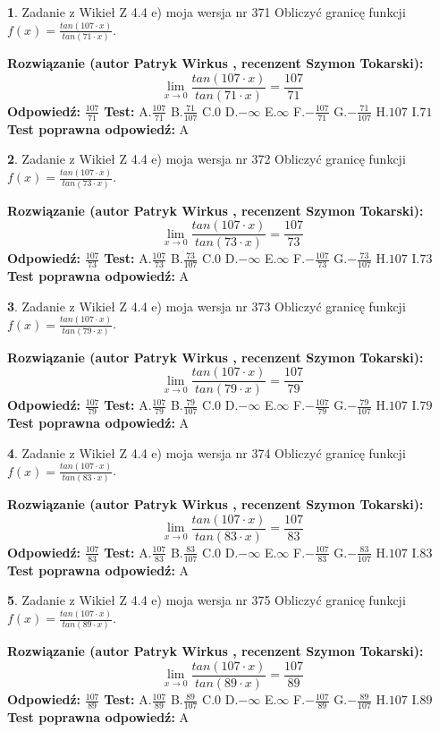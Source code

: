 \documentclass[12pt, a4paper]{article}
\theoremstyle{definition} %
\newtheorem{zad}{}
\newcommand{\zadStart}[1]{\begin{zad}#1\newline}
\newcommand{\zadStop}{\end{zad}}
\newcommand{\rozwStart}[2]{\noindent \textbf{Rozwiązanie (autor #1 , recenzent #2): }\newline}
\newcommand{\rozwStop}{\newline}
\newcommand{\odpStart}{\noindent \textbf{Odpowiedź:}\newline}
\newcommand{\odpStop}{\newline}
\newcommand{\testStart}{\noindent \textbf{Test:}\newline}
\newcommand{\testStop}{\newline}
\newcommand{\kluczStart}{\noindent \textbf{Test poprawna odpowiedź:}\newline}
\newcommand{\kluczStop}{\newline}
\begin{document}
\zadStart{Zadanie z Wikieł Z 4.4 e) moja wersja nr 371}
Obliczyć granicę funkcji $f(x)=\frac{tan(107\cdot x)}{tan(71\cdot x)}$.
\zadStop
\rozwStart{Patryk Wirkus}{Szymon Tokarski}
$$\lim\limits_{x\to 0}\frac{tan(107\cdot x)}{tan(71\cdot x)}=
\frac{107}{71}$$
\rozwStop
\odpStart
$\frac{107}{71}$
\odpStop
\testStart
A.$\frac{107}{71}$
B.$\frac{71}{107}$
C.$0$
D.$-\infty$
E.$\infty$
F.$-\frac{107}{71}$
G.$-\frac{71}{107}$
H.$107$
I.$71$
\testStop
\kluczStart
A
\kluczStop



\zadStart{Zadanie z Wikieł Z 4.4 e) moja wersja nr 372}
Obliczyć granicę funkcji $f(x)=\frac{tan(107\cdot x)}{tan(73\cdot x)}$.
\zadStop
\rozwStart{Patryk Wirkus}{Szymon Tokarski}
$$\lim\limits_{x\to 0}\frac{tan(107\cdot x)}{tan(73\cdot x)}=
\frac{107}{73}$$
\rozwStop
\odpStart
$\frac{107}{73}$
\odpStop
\testStart
A.$\frac{107}{73}$
B.$\frac{73}{107}$
C.$0$
D.$-\infty$
E.$\infty$
F.$-\frac{107}{73}$
G.$-\frac{73}{107}$
H.$107$
I.$73$
\testStop
\kluczStart
A
\kluczStop



\zadStart{Zadanie z Wikieł Z 4.4 e) moja wersja nr 373}
Obliczyć granicę funkcji $f(x)=\frac{tan(107\cdot x)}{tan(79\cdot x)}$.
\zadStop
\rozwStart{Patryk Wirkus}{Szymon Tokarski}
$$\lim\limits_{x\to 0}\frac{tan(107\cdot x)}{tan(79\cdot x)}=
\frac{107}{79}$$
\rozwStop
\odpStart
$\frac{107}{79}$
\odpStop
\testStart
A.$\frac{107}{79}$
B.$\frac{79}{107}$
C.$0$
D.$-\infty$
E.$\infty$
F.$-\frac{107}{79}$
G.$-\frac{79}{107}$
H.$107$
I.$79$
\testStop
\kluczStart
A
\kluczStop



\zadStart{Zadanie z Wikieł Z 4.4 e) moja wersja nr 374}
Obliczyć granicę funkcji $f(x)=\frac{tan(107\cdot x)}{tan(83\cdot x)}$.
\zadStop
\rozwStart{Patryk Wirkus}{Szymon Tokarski}
$$\lim\limits_{x\to 0}\frac{tan(107\cdot x)}{tan(83\cdot x)}=
\frac{107}{83}$$
\rozwStop
\odpStart
$\frac{107}{83}$
\odpStop
\testStart
A.$\frac{107}{83}$
B.$\frac{83}{107}$
C.$0$
D.$-\infty$
E.$\infty$
F.$-\frac{107}{83}$
G.$-\frac{83}{107}$
H.$107$
I.$83$
\testStop
\kluczStart
A
\kluczStop



\zadStart{Zadanie z Wikieł Z 4.4 e) moja wersja nr 375}
Obliczyć granicę funkcji $f(x)=\frac{tan(107\cdot x)}{tan(89\cdot x)}$.
\zadStop
\rozwStart{Patryk Wirkus}{Szymon Tokarski}
$$\lim\limits_{x\to 0}\frac{tan(107\cdot x)}{tan(89\cdot x)}=
\frac{107}{89}$$
\rozwStop
\odpStart
$\frac{107}{89}$
\odpStop
\testStart
A.$\frac{107}{89}$
B.$\frac{89}{107}$
C.$0$
D.$-\infty$
E.$\infty$
F.$-\frac{107}{89}$
G.$-\frac{89}{107}$
H.$107$
I.$89$
\testStop
\kluczStart
A
\kluczStop
\end{document}
